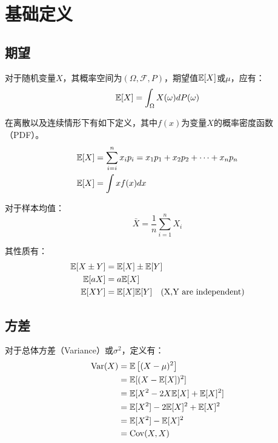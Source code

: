 \documentclass[11pt]{article}
\begin{document}
\maketitle
\tableofcontents

\section{基础定义}

\subsection{期望}

对于随机变量$X$，其概率空间为$(\Omega,\mathcal{F},P)$，期望值$\mathbb{E}[X]$或$\mu$，应有：
\begin{equation*}
    \mathbb{E}[X] = \int_{\Omega} X(\omega) dP(\omega)
\end{equation*}

在离散以及连续情形下有如下定义，其中$f(x)$为变量$X$的概率密度函数（PDF）。
\begin{align*}
    \mathbb{E}[X] &= \sum_{i=i}^n x_i p_i =x_1 p_1 + x_2 p_2 + \dots + x_n p_n \\
    \mathbb{E}[X] &= \int x f(x) dx
\end{align*}

对于样本均值：
\begin{equation*}
    \bar{X} = \frac{1}{n} \sum_{i=1}^{n} X_i
\end{equation*}

其性质有：
\begin{align*}
    \mathbb{E}[X \pm Y] &= \mathbb{E}[X] \pm \mathbb{E}[Y] \\
    \mathbb{E}[aX] &= a \mathbb{E}[X] \\
    \mathbb{E}[XY] &= \mathbb{E}[X]\mathbb{E}[Y] \quad \text{(X,Y are independent)}
\end{align*}

\subsection{方差}

对于总体方差（Variance）或$\sigma^2$，定义有：
\begin{align*}
    \operatorname{Var}(X) &= \mathbb{E}\left[ (X-\mu)^2 \right]\\
    &= \mathbb{E}[(X-\mathbb{E}[X])^2] \\
    &= \mathbb{E}[X^2 - 2X\mathbb{E}[X] + \mathbb{E}[X]^2] \\
    &= \mathbb{E}[X^2] - 2\mathbb{E}[X]^2 + \mathbb{E}[X]^2 \\
    &= \mathbb{E}[X^2] - \mathbb{E}[X]^2 \\
    &= \operatorname{Cov}(X,X)
\end{align*}
\end{document}
